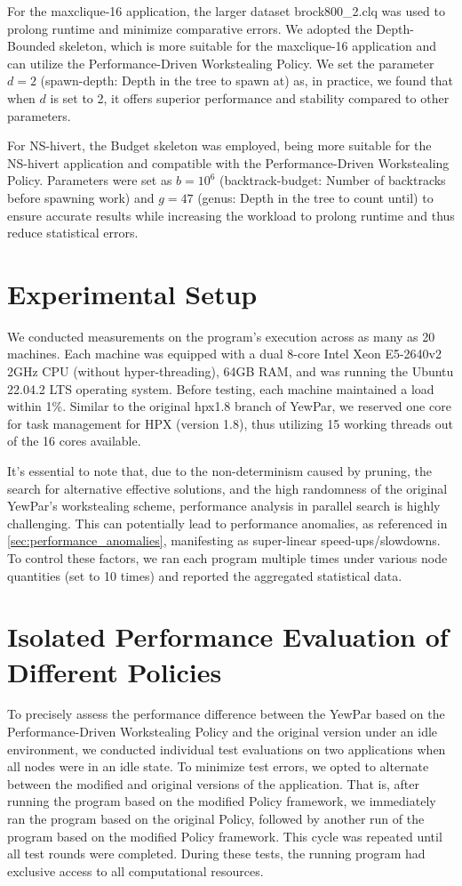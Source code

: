 \documentclass{mproj}
\begin{document}
For the maxclique-16 application, the larger dataset brock800\_2.clq was used to prolong runtime and minimize comparative errors.
We adopted the Depth-Bounded skeleton, which is more suitable for the maxclique-16 application and can utilize the Performance-Driven Workstealing Policy.
We set the parameter \(d = 2\) (spawn-depth: Depth in the tree to spawn at) as, in practice, we found that when \(d\) is set to 2, it offers superior performance and stability compared to other parameters.

For NS-hivert, the Budget skeleton was employed, being more suitable for the NS-hivert application and compatible with the Performance-Driven Workstealing Policy.
Parameters were set as \(b = 10^6\) (backtrack-budget: Number of backtracks before spawning work) and \(g = 47\) (genus: Depth in the tree to count until) to ensure accurate results while increasing the workload to prolong runtime and thus reduce statistical errors.

\section{Experimental Setup}
We conducted measurements on the program's execution across as many as 20 machines.
Each machine was equipped with a dual 8-core Intel Xeon E5-2640v2 2GHz CPU (without hyper-threading),
64GB RAM, and was running the Ubuntu 22.04.2 LTS operating system.
Before testing, each machine maintained a load within 1\%.
Similar to the original hpx1.8 branch of YewPar, we reserved one core for task management for HPX (version 1.8),
thus utilizing 15 working threads out of the 16 cores available.

It's essential to note that, due to the non-determinism caused by pruning, the search for alternative effective solutions, and the high randomness of the original YewPar's workstealing scheme,
performance analysis in parallel search is highly challenging.
This can potentially lead to performance anomalies, as referenced in \ref{sec:performance_anomalies},
manifesting as super-linear speed-ups/slowdowns.
To control these factors,
we ran each program multiple times under various node quantities (set to 10 times)
and reported the aggregated statistical data.

\section{Isolated Performance Evaluation of Different Policies}

To precisely assess the performance difference between the YewPar based on the Performance-Driven Workstealing Policy and the original version under an idle environment,
we conducted individual test evaluations on two applications when all nodes were in an idle state.
To minimize test errors,
we opted to alternate between the modified and original versions of the application.
That is, after running the program based on the modified Policy framework,
we immediately ran the program based on the original Policy,
followed by another run of the program based on the modified Policy framework.
This cycle was repeated until all test rounds were completed.
During these tests, the running program had exclusive access to all computational resources.
\end{document}
